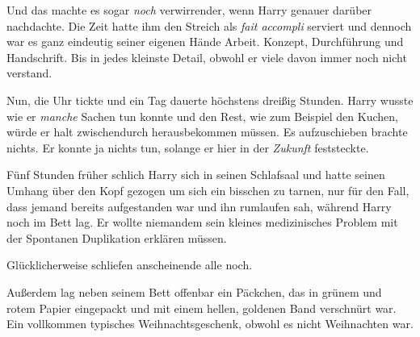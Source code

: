Und das machte es sogar \emph{noch} verwirrender, wenn Harry genauer darüber nachdachte. Die Zeit hatte ihm den Streich als \emph{fait accompli} serviert und dennoch war es ganz eindeutig seiner eigenen Hände Arbeit. Konzept, Durchführung und Handschrift. Bis in jedes kleinste Detail, obwohl er viele davon immer noch nicht verstand.

Nun, die Uhr tickte und ein Tag dauerte höchstens dreißig Stunden. Harry wusste wie er \emph{manche} Sachen tun konnte und den Rest, wie zum Beispiel den Kuchen, würde er halt zwischendurch herausbekommen müssen. Es aufzuschieben brachte nichts. Er konnte ja nichts tun, solange er hier in der \emph{Zukunft} feststeckte.

\later

Fünf Stunden früher schlich Harry sich in seinen Schlafsaal und hatte seinen Umhang über den Kopf gezogen um sich ein bisschen zu tarnen, nur für den Fall, dass jemand bereits aufgestanden war und ihn rumlaufen sah, während Harry noch im Bett lag. Er wollte niemandem sein kleines medizinisches Problem mit der Spontanen Duplikation erklären müssen.

Glücklicherweise schliefen anscheinende alle noch.

Außerdem lag neben seinem Bett offenbar ein Päckchen, das in grünem und rotem Papier eingepackt und mit einem hellen, goldenen Band verschnürt war. Ein vollkommen typisches Weihnachtsgeschenk, obwohl es nicht Weihnachten war.

